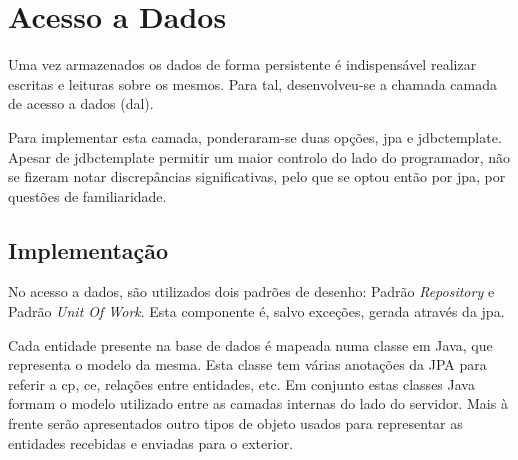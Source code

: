 %
%
\section{Acesso a Dados}\label{sec33}

Uma vez armazenados os dados de forma persistente é indispensável realizar escritas e leituras sobre os mesmos. Para tal, desenvolveu-se a chamada camada de acesso a dados (\acrshort{dal}). 

Para implementar esta camada, ponderaram-se duas opções, \gls{jpa} e \gls{jdbctemplate}. Apesar de \acrshort{jdbctemplate} permitir um maior controlo do lado do programador, não se fizeram notar discrepâncias significativas, pelo que se optou então por \acrshort{jpa}, por questões de familiaridade.

 \subsection{Implementação}\label{subsec331}
 
 No acesso a dados, são utilizados dois padrões de desenho: Padrão \textit{Repository} e Padrão \textit{Unit Of Work}. Esta componente é, salvo exceções, gerada através da \acrshort{jpa}.
 
 Cada entidade presente na base de dados é mapeada numa classe em Java, que representa o modelo da mesma. Esta classe tem várias anotações da JPA para referir a \acrlong{cp}, \acrlong{ce}, relações entre entidades, etc. Em conjunto estas classes Java formam o modelo utilizado entre as camadas internas do lado do servidor. Mais à frente serão apresentados outro tipos de objeto usados para representar as entidades recebidas e enviadas para o exterior.
 
 
